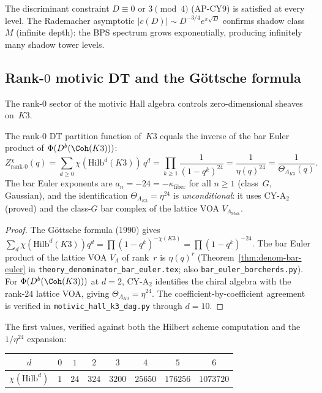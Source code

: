 \noindent The discriminant constraint $D \equiv 0$ or $3 \pmod{4}$ (AP-CY9) is satisfied at every level. The Rademacher asymptotic $|c(D)| \sim D^{-3/4} e^{\pi\sqrt{D}}$ confirms shadow class~$M$ (infinite depth): the BPS spectrum grows exponentially, producing infinitely many shadow tower levels.

\subsection{Rank-$0$ motivic DT and the G\"ottsche formula}
\label{subsec:k3e-motivic-dt-rank0}

The rank-$0$ sector of the motivic Hall algebra controls zero-dimensional sheaves on~$K3$.

\begin{proposition}[Rank-$0$ DT = bar Euler inverse]
\label{prop:k3e-dt-bar-rank0}
\ClaimStatusProvedHere
The rank-$0$ DT partition function of~$K3$ equals the inverse of the bar Euler product of $\Phi(D^b(\Coh(K3)))$:
\[
  Z^{\chi}_{\mathrm{rank\text{-}0}}(q)
  = \sum_{d \geq 0} \chi(\mathrm{Hilb}^d(K3)) \, q^d
  = \prod_{k \geq 1} \frac{1}{(1-q^k)^{24}}
  = \frac{1}{\eta(q)^{24}}
  = \frac{1}{\Theta_{A_{K3}}(q)}.
\]
The bar Euler exponents are $a_n = -24 = -\kappa_{\mathrm{fiber}}$ for all $n \geq 1$ (class~$G$, Gaussian), and the identification $\Theta_{A_{K3}} = \eta^{24}$ is \emph{unconditional}: it uses CY-A$_2$ (proved) and the class-$G$ bar complex of the lattice VOA $V_{\Lambda_{\mathrm{Muk}}}$.
\end{proposition}

\begin{proof}
The G\"ottsche formula (1990) gives $\sum_d \chi(\mathrm{Hilb}^d(K3)) q^d = \prod (1-q^k)^{-\chi(K3)} = \prod(1-q^k)^{-24}$.  The bar Euler product of the lattice VOA $V_\Lambda$ of rank~$r$ is $\eta(q)^r$ (Theorem~\ref{thm:denom-bar-euler} in \texttt{theory\_denominator\_bar\_euler.tex}; also \texttt{bar\_euler\_borcherds.py}).  For $\Phi(D^b(\Coh(K3)))$ at $d=2$, CY-A$_2$ identifies the chiral algebra with the rank-$24$ lattice VOA, giving $\Theta_{A_{K3}} = \eta^{24}$.  The coefficient-by-coefficient agreement is verified in \texttt{motivic\_hall\_k3\_dag.py} through $d = 10$.
\end{proof}

The first values, verified against both the Hilbert scheme computation and the $1/\eta^{24}$ expansion:
\begin{center}
\begin{tabular}{c|ccccccc}
$d$ & $0$ & $1$ & $2$ & $3$ & $4$ & $5$ & $6$ \\ \hline
$\chi(\mathrm{Hilb}^d)$ & $1$ & $24$ & $324$ & $3200$ & $25650$ & $176256$ & $1073720$
\end{tabular}
\end{center}

